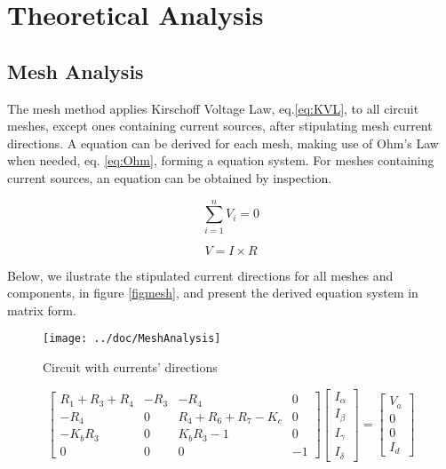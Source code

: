 \section{Theoretical Analysis}
\label{sec:analysis}

\subsection{Mesh Analysis}

\par The mesh method applies Kirschoff Voltage Law, eq.\ref{eq:KVL}, to all circuit meshes, except ones containing current sources, after stipulating mesh current directions. A equation can be derived for each mesh, making use of Ohm's Law when needed, eq. \ref{eq:Ohm}, forming a equation system. For meshes containing current sources, an equation can be obtained by inspection.

\begin{multicols}{2}
\begin{equation}
    \sum_{i=1}^{n} V_i = 0
    \label{eq:KVL}
\end{equation}

\begin{equation}
    V = I \times R
    \label{eq:Ohm}
\end{equation}
\end{multicols}

Below, we ilustrate the stipulated current directions for all meshes and components, in figure \ref{figmesh}, and present the derived equation system in matrix form.


\begin{figure}[H]
  \centering
  \texttt{[image: ../doc/MeshAnalysis]}
  \caption{Circuit with currents' directions}
  \label{fig:figmesh}
\end{figure}

\begin{equation*}
\begin{bmatrix} R_1+R_3+R_4 & -R_3 & -R_4 & 0 \\
 -R_4 & 0 & R_4+R_6+R_7-K_c & 0 \\
 -K_bR_3 & 0 & K_bR_3-1 & 0 \\
 0 & 0 & 0 & -1 \end{bmatrix} \begin{bmatrix} I_{\alpha}\\ I_{\beta}\\ I_{\gamma} \\ I_{\delta} \end{bmatrix} = \begin{bmatrix} V_a\\ 0\\ 0\\ I_d \end{bmatrix}
\end{equation*}

